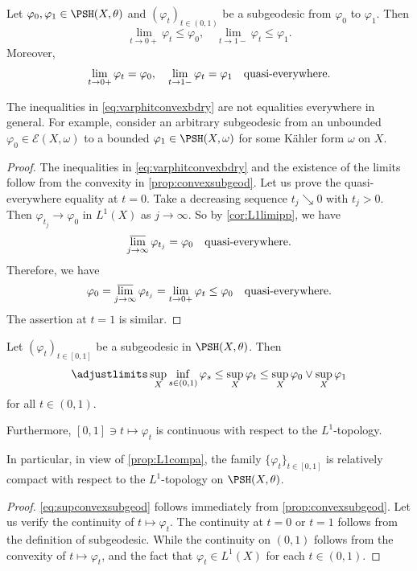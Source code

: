 \begin{corollary}\label{cor:subgeodboundary}
    Let $\varphi_0,\varphi_1\in \PSH(X,\theta)$ and $(\varphi_t)_{t\in (0,1)}$ be a subgeodesic from $\varphi_0$ to $\varphi_1$. Then
    \begin{equation}\label{eq:varphitconvexbdry}
    \lim_{t\to 0+}\varphi_t\leq \varphi_0,\quad   \lim_{t\to 1-}\varphi_t\leq \varphi_1.
    \end{equation}
    Moreover,
    \[
    \lim_{t\to 0+}\varphi_t=\varphi_0,\quad   \lim_{t\to 1-}\varphi_t=\varphi_1\quad \textup{quasi-everywhere}.
    \]
\end{corollary}
The inequalities in \eqref{eq:varphitconvexbdry} are not equalities everywhere in general. For example, consider an arbitrary subgeodesic from an unbounded $\varphi_0\in \mathcal{E}(X,\omega)$ to a bounded $\varphi_1\in \PSH(X,\omega)$ for some Kähler form $\omega$ on $X$.
\begin{proof}
    The inequalities in \eqref{eq:varphitconvexbdry} and the existence of the limits follow from the convexity in \cref{prop:convexsubgeod}. Let us prove the quasi-everywhere equality at $t=0$. Take a decreasing sequence $t_j\searrow 0$ with $t_j>0$. Then $\varphi_{t_j}\to \varphi_0$ in $L^1(X)$ as $j\to\infty$. So by \cref{cor:L1limipp}, we have
    \[
    \varlimsup_{j\to\infty}\varphi_{t_j}= \varphi_0\quad \textup{quasi-everywhere}.
    \]
    Therefore, we have
    \[
    \varphi_0=\varlimsup_{j\to\infty}\varphi_{t_j}=\lim_{t\to 0+}\varphi_t\leq \varphi_0\quad \textup{quasi-everywhere}.
    \]
    The assertion at $t=1$ is similar.
\end{proof}


\begin{corollary}\label{cor:convexsubgeod}
    Let $(\varphi_t)_{t\in [0,1]}$ be a subgeodesic in $\PSH(X,\theta)$. Then
    \begin{equation}\label{eq:supconvexsubgeod}
        \adjustlimits\sup_X \inf_{s\in (0,1)}\varphi_s \leq \sup_X \varphi_t\leq \sup_X \varphi_0\lor \sup_X \varphi_1
    \end{equation}
    for all $t\in (0,1)$.

    Furthermore, $[0,1] \ni t\mapsto \varphi_t$ is continuous with respect to the $L^1$-topology.
\end{corollary}
In particular, in view of \cref{prop:L1compa}, the family $\{\varphi_t\}_{t\in [0,1]}$ is relatively compact with respect to the $L^1$-topology on $\PSH(X,\theta)$.
\begin{proof}
    \eqref{eq:supconvexsubgeod} follows immediately from \cref{prop:convexsubgeod}.
    Let us verify the continuity of $t\mapsto \varphi_t$. The continuity at $t=0$ or $t=1$ follows from the definition of subgeodesic. While the continuity on $(0,1)$ follows from the convexity of $t\mapsto \varphi_t$, and the fact that $\varphi_t\in L^1(X)$ for each $t\in (0,1)$.
\end{proof}


